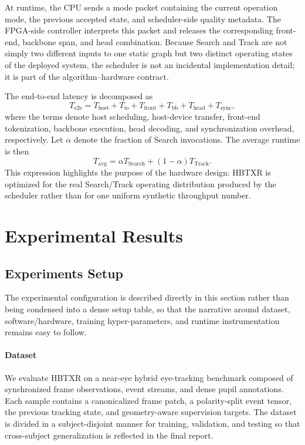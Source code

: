\documentclass[journal]{IEEEtran}
\begin{document}
At runtime, the CPU sends a mode packet containing the current operation mode, the previous accepted state, and scheduler-side quality metadata. The FPGA-side controller interprets this packet and releases the corresponding front-end, backbone span, and head combination. Because Search and Track are not simply two different inputs to one static graph but two distinct operating states of the deployed system, the scheduler is not an incidental implementation detail; it is part of the algorithm--hardware contract.

The end-to-end latency is decomposed as
\begin{equation}
T_{\mathrm{e2e}} = T_{\mathrm{host}} + T_{\mathrm{io}} + T_{\mathrm{front}} + T_{\mathrm{bb}} + T_{\mathrm{head}} + T_{\mathrm{sync}},
\end{equation}
where the terms denote host scheduling, host-device transfer, front-end tokenization, backbone execution, head decoding, and synchronization overhead, respectively. Let $\alpha$ denote the fraction of Search invocations. The average runtime is then
\begin{equation}
T_{\mathrm{avg}} = \alpha T_{\mathrm{Search}} + (1-\alpha)T_{\mathrm{Track}}.
\end{equation}
This expression highlights the purpose of the hardware design: HBTXR is optimized for the real Search/Track operating distribution produced by the scheduler rather than for one uniform synthetic throughput number.

\section{Experimental Results}
\subsection{Experiments Setup}
The experimental configuration is described directly in this section rather than being condensed into a dense setup table, so that the narrative around dataset, software/hardware, training hyper-parameters, and runtime instrumentation remains easy to follow.

\paragraph*{Dataset}
We evaluate HBTXR on a near-eye hybrid eye-tracking benchmark composed of synchronized frame observations, event streams, and dense pupil annotations. Each sample contains a canonicalized frame patch, a polarity-split event tensor, the previous tracking state, and geometry-aware supervision targets. The dataset is divided in a subject-disjoint manner for training, validation, and testing so that cross-subject generalization is reflected in the final report.
\end{document}
